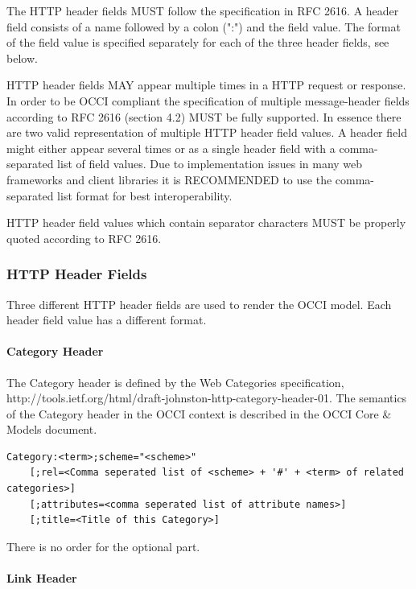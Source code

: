 \documentclass[10pt,a4paper]{article}
\begin{document}
The HTTP header fields MUST follow the specification in RFC 2616. A header field consists of a name followed by a colon (":") and the field value. The format of the field value is specified separately for each of the three header fields, see below.

HTTP header fields MAY appear multiple times in a HTTP request or response. In order to be OCCI compliant the specification of multiple message-header fields according to RFC 2616 (section 4.2) MUST be fully supported. In essence there are two valid representation of multiple HTTP header field values. A header field might either appear several times or as a single header field with a comma-separated list of field values. Due to implementation issues in many web frameworks and client libraries it is RECOMMENDED to use the comma-separated list format for best interoperability.

HTTP header field values which contain separator characters MUST be properly quoted according to RFC 2616.

\subsubsection{HTTP Header Fields}

Three different HTTP header fields are used to render the OCCI model. Each header field value has a different format.

\paragraph{Category Header}

The Category header is defined by the Web Categories specification, http://tools.ietf.org/html/draft-johnston-http-category-header-01. The semantics of the Category header in the OCCI context is described in the OCCI Core \& Models document.

\begin{verbatim}
Category:<term>;scheme="<scheme>"
    [;rel=<Comma seperated list of <scheme> + '#' + <term> of related categories>]
    [;attributes=<comma seperated list of attribute names>]
    [;title=<Title of this Category>]    
\end{verbatim}

There is no order for the optional part.

\paragraph{Link Header}
\end{document}
